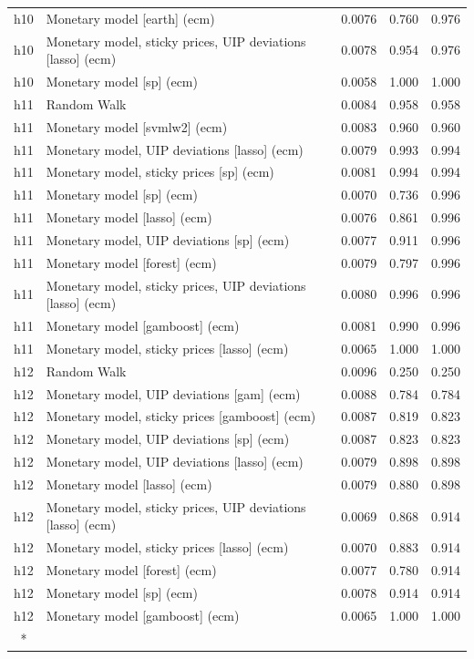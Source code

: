\begin{ThreePartTable}
\begin{longtable}[t]{cp{5.5cm}ccc}
h10 & \raggedright Monetary model [earth] (ecm) & 0.0076 & 0.760 & 0.976\\
h10 & \raggedright Monetary model, sticky prices, UIP deviations [lasso] (ecm) & 0.0078 & 0.954 & 0.976\\
h10 & \raggedright Monetary model [sp] (ecm) & 0.0058 & 1.000 & 1.000\\
\addlinespace
h11 & \raggedright Random Walk & 0.0084 & 0.958 & 0.958\\
h11 & \raggedright Monetary model [svmlw2] (ecm) & 0.0083 & 0.960 & 0.960\\
h11 & \raggedright Monetary model, UIP deviations [lasso] (ecm) & 0.0079 & 0.993 & 0.994\\
h11 & \raggedright Monetary model, sticky prices [sp] (ecm) & 0.0081 & 0.994 & 0.994\\
h11 & \raggedright Monetary model [sp] (ecm) & 0.0070 & 0.736 & 0.996\\
h11 & \raggedright Monetary model [lasso] (ecm) & 0.0076 & 0.861 & 0.996\\
h11 & \raggedright Monetary model, UIP deviations [sp] (ecm) & 0.0077 & 0.911 & 0.996\\
h11 & \raggedright Monetary model [forest] (ecm) & 0.0079 & 0.797 & 0.996\\
h11 & \raggedright Monetary model, sticky prices, UIP deviations [lasso] (ecm) & 0.0080 & 0.996 & 0.996\\
h11 & \raggedright Monetary model [gamboost] (ecm) & 0.0081 & 0.990 & 0.996\\
h11 & \raggedright Monetary model, sticky prices [lasso] (ecm) & 0.0065 & 1.000 & 1.000\\
\addlinespace
h12 & \raggedright Random Walk & 0.0096 & 0.250 & 0.250\\
h12 & \raggedright Monetary model, UIP deviations [gam] (ecm) & 0.0088 & 0.784 & 0.784\\
h12 & \raggedright Monetary model, sticky prices [gamboost] (ecm) & 0.0087 & 0.819 & 0.823\\
h12 & \raggedright Monetary model, UIP deviations [sp] (ecm) & 0.0087 & 0.823 & 0.823\\
h12 & \raggedright Monetary model, UIP deviations [lasso] (ecm) & 0.0079 & 0.898 & 0.898\\
h12 & \raggedright Monetary model [lasso] (ecm) & 0.0079 & 0.880 & 0.898\\
h12 & \raggedright Monetary model, sticky prices, UIP deviations [lasso] (ecm) & 0.0069 & 0.868 & 0.914\\
h12 & \raggedright Monetary model, sticky prices [lasso] (ecm) & 0.0070 & 0.883 & 0.914\\
h12 & \raggedright Monetary model [forest] (ecm) & 0.0077 & 0.780 & 0.914\\
h12 & \raggedright Monetary model [sp] (ecm) & 0.0078 & 0.914 & 0.914\\
h12 & \raggedright Monetary model [gamboost] (ecm) & 0.0065 & 1.000 & 1.000\\*
\end{longtable}
\end{ThreePartTable}
\endgroup{}
